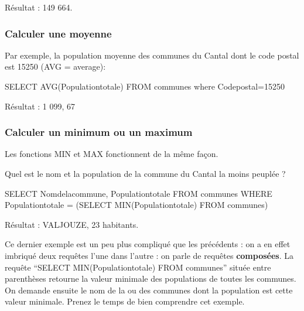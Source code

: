 \documentclass[
  a4paper,
  DIV=11,
  numbers=noendperiod]{scrartcl}
\newenvironment{Shaded}{\begin{snugshade}}{\end{snugshade}}
\newcommand{\DecValTok}[1]{\textcolor[rgb]{0.68,0.00,0.00}{#1}}
\newcommand{\FunctionTok}[1]{\textcolor[rgb]{0.28,0.35,0.67}{#1}}
\newcommand{\KeywordTok}[1]{\textcolor[rgb]{0.00,0.23,0.31}{#1}}
\newcommand{\NormalTok}[1]{\textcolor[rgb]{0.00,0.23,0.31}{#1}}
\newcommand{\OperatorTok}[1]{\textcolor[rgb]{0.37,0.37,0.37}{#1}}
\begin{document}
Résultat : 149 664.

\hypertarget{calculer-une-moyenne}{%
\subsubsection{Calculer une moyenne}\label{calculer-une-moyenne}}

Par exemple, la population moyenne des communes du Cantal dont le code
postal est 15250 (AVG = average):

\begin{Shaded}
\begin{Highlighting}[]
\KeywordTok{SELECT} \FunctionTok{AVG}\NormalTok{(Populationtotale)}
\KeywordTok{FROM}\NormalTok{ communes}
\KeywordTok{where}\NormalTok{ Codepostal}\OperatorTok{=}\DecValTok{15250}
\end{Highlighting}
\end{Shaded}

Résultat : 1 099, 67

\hypertarget{calculer-un-minimum-ou-un-maximum}{%
\subsubsection{Calculer un minimum ou un
maximum}\label{calculer-un-minimum-ou-un-maximum}}

Les fonctions MIN et MAX fonctionnent de la même façon.

Quel est le nom et la population de la commune du Cantal la moins
peuplée ?

\begin{Shaded}
\begin{Highlighting}[]
\KeywordTok{SELECT}\NormalTok{ Nomdelacommune, Populationtotale}
\KeywordTok{FROM}\NormalTok{ communes}
\KeywordTok{WHERE}\NormalTok{ Populationtotale }\OperatorTok{=}\NormalTok{ (}\KeywordTok{SELECT} \FunctionTok{MIN}\NormalTok{(Populationtotale) }\KeywordTok{FROM}\NormalTok{ communes)}
\end{Highlighting}
\end{Shaded}

Résultat : VALJOUZE, 23 habitants.

\begin{tcolorbox}[enhanced jigsaw, toprule=.15mm, colbacktitle=quarto-callout-note-color!10!white, opacityback=0, opacitybacktitle=0.6, arc=.35mm, colback=white, rightrule=.15mm, bottomtitle=1mm, bottomrule=.15mm, title=\textcolor{quarto-callout-note-color}{\faInfo}\hspace{0.5em}{Remarque}, toptitle=1mm, titlerule=0mm, leftrule=.75mm, coltitle=black, left=2mm, breakable]

Ce dernier exemple est un peu plus compliqué que les précédents : on a
en effet imbriqué deux requêtes l'une dans l'autre : on parle de
requêtes \textbf{composées}. La requête ``SELECT MIN(Populationtotale)
FROM communes'' située entre parenthèses retourne la valeur minimale des
populations de toutes les communes. On demande ensuite le nom de la ou
des communes dont la population est cette valeur minimale. Prenez le
temps de bien comprendre cet exemple.

\end{tcolorbox}
\end{document}
